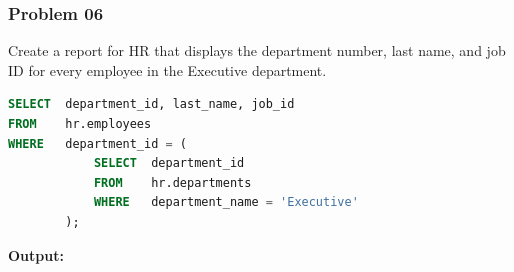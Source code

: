\vspace{5cm}
\subsubsection*{Problem 06}
Create a report for HR that displays the department number, last name, and job ID for every employee in the Executive department.

\begin{frame}



\begin{lstlisting}[language=SQL]
SELECT 	department_id, last_name, job_id
FROM 	hr.employees
WHERE 	department_id = (
   			SELECT 	department_id
   			FROM 	hr.departments
   			WHERE 	department_name = 'Executive'
		);
\end{lstlisting}
\textbf{Output: }
\end{frame}


\newpage
